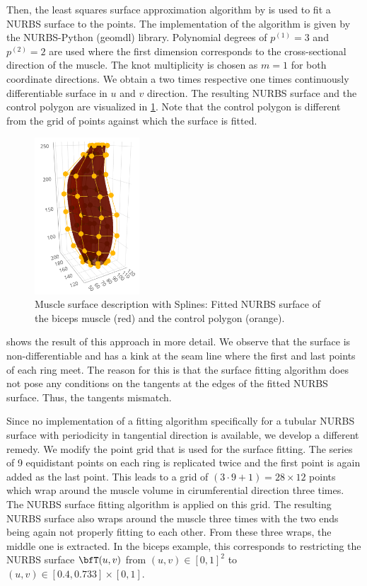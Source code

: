Then, the least squares surface approximation algorithm by \cite{piegl2012nurbs} is used to fit a NURBS surface to the points. The implementation of the algorithm is given by the NURBS-Python (geomdl) library. Polynomial degrees of $p^{(1)} = 3$ and $p^{(2)}=2$ are used where the first dimension corresponds to the cross-sectional direction of the muscle. The knot multiplicity is chosen as $m=1$ for both coordinate directions. We obtain a two times respective one times continuously differentiable surface in $u$ and $v$ direction. 
The resulting NURBS surface and the control polygon are visualized in \cref{fig:biceps_splines_control_points}. Note that the control polygon is different from the grid of points against which the surface is fitted.
%
\begin{figure}%
  \centering%
  \includegraphics[width=0.35\textwidth]{images/fiber_creation/splines01red.png}%
  \caption{Muscle surface description with Splines: Fitted NURBS surface of the biceps muscle (red) and the control polygon (orange).}%
  \label{fig:biceps_splines_control_points}%
\end{figure}%

 shows the result of this approach in more detail. We observe that the surface is non-differentiable and has a kink at the seam line where the first and last points of each ring meet. The reason for this is that the surface fitting algorithm does not pose any conditions on the tangents at the edges of the fitted NURBS surface.  Thus, the tangents mismatch.

Since no implementation of a fitting algorithm specifically for a tubular NURBS surface with periodicity in tangential direction is available, we develop a different remedy. We modify the point grid that is used for the surface fitting. The series of 9 equidistant points on each ring is replicated twice and the first point is again added as the last point. This leads to a grid of $(3\cdot 9+1) = 28 \times 12$ points which wrap around the muscle volume in cirumferential direction three times. The NURBS surface fitting algorithm is applied on this grid. The resulting NURBS surface also wraps around the muscle three times with the two ends being again not properly fitting to each other. From these three wraps, the middle one is extracted. In the biceps example, this corresponds to restricting the NURBS surface $\bfT(u,v)$ from $(u,v) \in [0,1]^2$ to $(u,v) \in [0.4,0.733]\times [0,1]$.

